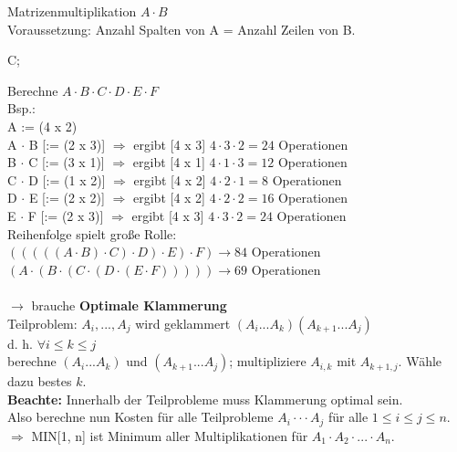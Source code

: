 Matrizenmultiplikation $A \cdot B$\\
Voraussetzung: Anzahl Spalten von A = Anzahl Zeilen von B.\\
\begin{algorithmic}
\EndFor
\Return C;
\end{algorithmic}
Berechne $A \cdot B \cdot C \cdot D \cdot E \cdot F$\\
Bsp.: \\
A := (4 x 2)\\
A $\cdot$ B [:= (2 x 3)] $\Rightarrow$ ergibt [4 x 3] $4 \cdot 3 \cdot 2 = 24$ Operationen\\
B $\cdot$ C [:= (3 x 1)] $\Rightarrow$ ergibt [4 x 1] $4 \cdot 1 \cdot 3 = 12$ Operationen\\
C $\cdot$ D [:= (1 x 2)] $\Rightarrow$ ergibt [4 x 2] $4 \cdot 2 \cdot 1 = 8$ Operationen\\
D $\cdot$ E [:= (2 x 2)] $\Rightarrow$ ergibt [4 x 2] $4 \cdot 2 \cdot 2 = 16$ Operationen\\
E $\cdot$ F [:= (2 x 3)] $\Rightarrow$ ergibt [4 x 3] $4 \cdot 3 \cdot 2 = 24$ Operationen\\	
Reihenfolge spielt große Rolle: \\
$(((((A \cdot B) \cdot C) \cdot D) \cdot E) \cdot F) \rightarrow 84$ Operationen\\
$(A \cdot (B \cdot (C \cdot (D \cdot (E \cdot F))))) \rightarrow 69$ Operationen\\
\ \\
$\rightarrow$ brauche \textbf{Optimale Klammerung}\\
Teilproblem: $A_i, ..., A_j$ wird geklammert $(A_i... A_k)(A_{k+1}...A_j)$\\
d. h. $\forall i \leq k \leq j$\\
berechne $(A_i... A_k)$ und $(A_{k+1}...A_j)$; multipliziere $A_{i,k}$ mit $A_{k+1, j}$. Wähle dazu bestes $k$.\\
\textbf{Beachte:} Innerhalb der Teilprobleme muss Klammerung optimal sein.\\
Also berechne nun Kosten für alle Teilprobleme $A_i \cdot \cdot \cdot A_j$ für alle $1 \leq i \leq j \leq n$.
$\Rightarrow$ MIN[1, n] ist Minimum aller Multiplikationen für $A_1 \cdot A_2 \cdot ... \cdot A_n$.\\
